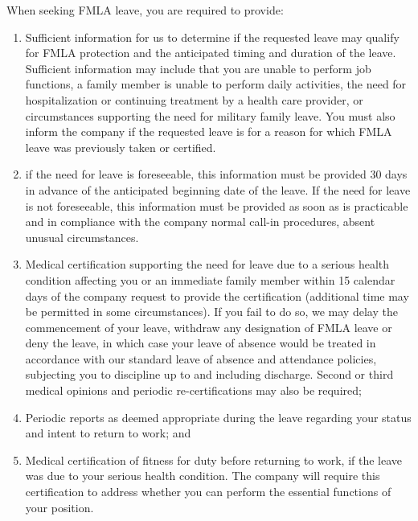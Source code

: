When seeking FMLA leave, you are required to provide:

\begin{enumerate} 	\item Sufficient information for us to determine if the 	requested leave may qualify for FMLA protection 	and the anticipated timing and duration of the 	leave. Sufficient information may include that 	you are unable to perform job functions, a family 	member is unable to perform daily activities, the 	need for hospitalization or continuing treatment 	by a health care provider, or circumstances 	supporting the need for military family leave. 	You must also inform the company if the 	requested leave is for a reason for which FMLA 	leave was previously taken or certified.
	
	\item if the need for leave is foreseeable, this 	information must be provided 30 days in 	advance of the anticipated beginning date of the 	leave. If the need for leave is not foreseeable, 	this information must be provided as soon as is 	practicable and in compliance with the company 	normal call-in procedures, absent unusual 	circumstances.
	
	\item Medical certification supporting the need for 	leave due to a serious health condition affecting 	you or an immediate family member within 15 	calendar days of the company request to 	provide the certification (additional time may be 	permitted in some circumstances). If you fail to 	do so, we may delay the commencement of your 	leave, withdraw any designation of FMLA leave 	or deny the leave, in which case your leave of 	absence would be treated in accordance with 	our standard leave of absence and attendance 	policies, subjecting you to discipline up to and 	including discharge. Second or third medical 	opinions and periodic re-certifications may also 	be required;
	
	\item Periodic reports as deemed appropriate during 	the leave regarding your status and intent to 	return to work; and
	
	\item Medical certification of fitness for duty before 	returning to work, if the leave was due to your 	serious health condition. The company will 	require this certification to address whether you 	can perform the essential functions of your 	position. \end{enumerate}

